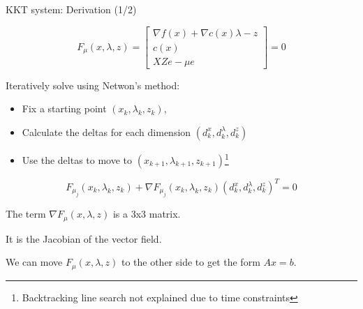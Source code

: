 \documentclass{beamer}
\begin{document}
\begin{frame}{KKT system: Derivation (1/2)}

  \[
    F_\mu(x,\lambda,z) =
    \begin{bmatrix}
      \nabla f(x) + \nabla c(x)\lambda - z \\
      c(x)                                 \\
      XZe - \mu e
    \end{bmatrix} = 0
  \]

  \pause

  Iteratively solve using Netwon's method:

  \begin{itemize}
    \item Fix a starting point $(x_k, \lambda_k, z_k)$,
    \item Calculate the deltas for each dimension $(d_k^x, d_k^\lambda, d_k^z)$
    \item Use the deltas to move to $(x_{k+1}, \lambda_{k+1}, z_{k+1})$\footnote{\tiny Backtracking line search not explained due to time constraints}
  \end{itemize}

  \[
    F_{\mu_j}(x_k,\lambda_k,z_k) + \nabla F_{\mu_j}(x_k,\lambda_k,z_k) (d_k^x, d_k^\lambda, d_k^z)^T = 0
  \]

  \pause
  \vfill

  The term $\nabla F_\mu(x,\lambda,z)$ is a 3x3 matrix.

  It is the Jacobian of the vector field.

  We can move $F_\mu(x,\lambda,z)$ to the other side to get the form $A x = b$.

\end{frame}
\end{document}
